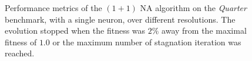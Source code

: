 \begin{figure}[h]
\begin{center}
    \end{center}
    \caption{Performance metrics of the $(1 + 1)$ NA algorithm on the \textit{Quarter} benchmark, with a single neuron, over different resolutions.
    The evolution stopped when the fitness was $2\%$ away from the maximal fitness of $1.0$ or the maximum number of stagnation iteration was reached.}
    \label{fig:na_quarter_stagnation}
\end{figure}
